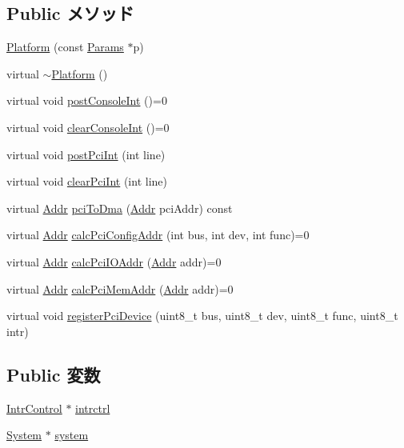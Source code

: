 \subsection*{Public メソッド}
\begin{DoxyCompactItemize}
\item 
\hyperlink{classPlatform_a3741160d0c1f6688a4e38bc97bdd15d3}{Platform} (const \hyperlink{classPlatform_af4e77eaf2602e4808deef7d1ba95e579}{Params} $\ast$p)
\item 
virtual \hyperlink{classPlatform_ac9776566b67c64e4c343b6e6546cb177}{$\sim$Platform} ()
\item 
virtual void \hyperlink{classPlatform_a24ab6780a0fa391b19980027355ba467}{postConsoleInt} ()=0
\item 
virtual void \hyperlink{classPlatform_aaf1bfcf0f5ac95c6a9d1607172a5a29e}{clearConsoleInt} ()=0
\item 
virtual void \hyperlink{classPlatform_a545d1445357706d7259aa73104f44222}{postPciInt} (int line)
\item 
virtual void \hyperlink{classPlatform_a0d98ea2b236bb883fa15d63a59a2ec9e}{clearPciInt} (int line)
\item 
virtual \hyperlink{base_2types_8hh_af1bb03d6a4ee096394a6749f0a169232}{Addr} \hyperlink{classPlatform_a87078b3d3a28ae134f6736337e90dac3}{pciToDma} (\hyperlink{base_2types_8hh_af1bb03d6a4ee096394a6749f0a169232}{Addr} pciAddr) const 
\item 
virtual \hyperlink{base_2types_8hh_af1bb03d6a4ee096394a6749f0a169232}{Addr} \hyperlink{classPlatform_a4a2bdce1a8794dd3ea6ca12b36320433}{calcPciConfigAddr} (int bus, int dev, int func)=0
\item 
virtual \hyperlink{base_2types_8hh_af1bb03d6a4ee096394a6749f0a169232}{Addr} \hyperlink{classPlatform_a3d1d55996e865ab1b65c732496c08b00}{calcPciIOAddr} (\hyperlink{base_2types_8hh_af1bb03d6a4ee096394a6749f0a169232}{Addr} addr)=0
\item 
virtual \hyperlink{base_2types_8hh_af1bb03d6a4ee096394a6749f0a169232}{Addr} \hyperlink{classPlatform_a303d8161e77b31b8425cb320562a54b2}{calcPciMemAddr} (\hyperlink{base_2types_8hh_af1bb03d6a4ee096394a6749f0a169232}{Addr} addr)=0
\item 
virtual void \hyperlink{classPlatform_a04c0d51f5dc49c970da514b7e8f46c14}{registerPciDevice} (uint8\_\-t bus, uint8\_\-t dev, uint8\_\-t func, uint8\_\-t intr)
\end{DoxyCompactItemize}
\subsection*{Public 変数}
\begin{DoxyCompactItemize}
\item 
\hyperlink{classIntrControl}{IntrControl} $\ast$ \hyperlink{classPlatform_aab4191dd66c041ed67fb31d758ab705e}{intrctrl}
\item 
\hyperlink{classSystem}{System} $\ast$ \hyperlink{classPlatform_af27ccd765f13a4b7bd119dc7579e2746}{system}
\end{DoxyCompactItemize}
